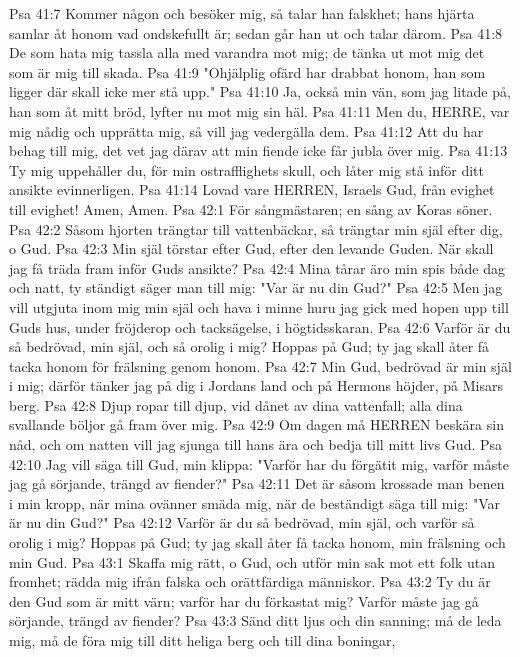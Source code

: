 Psa 41:7  Kommer någon och besöker mig, så talar han falskhet; hans hjärta samlar åt honom vad ondskefullt är; sedan går han ut och talar därom.
Psa 41:8  De som hata mig tassla alla med varandra mot mig; de tänka ut mot mig det som är mig till skada.
Psa 41:9  "Ohjälplig ofärd har drabbat honom, han som ligger där skall icke mer stå upp."
Psa 41:10  Ja, också min vän, som jag litade på, han som åt mitt bröd, lyfter nu mot mig sin häl.
Psa 41:11  Men du, HERRE, var mig nådig och upprätta mig, så vill jag vedergälla dem.
Psa 41:12  Att du har behag till mig, det vet jag därav att min fiende icke får jubla över mig.
Psa 41:13  Ty mig uppehåller du, för min ostrafflighets skull, och låter mig stå inför ditt ansikte evinnerligen.
Psa 41:14  Lovad vare HERREN, Israels Gud, från evighet till evighet! Amen, Amen.
Psa 42:1  För sångmästaren; en sång av Koras söner.
Psa 42:2  Såsom hjorten trängtar till vattenbäckar, så trängtar min själ efter dig, o Gud.
Psa 42:3  Min själ törstar efter Gud, efter den levande Guden. När skall jag få träda fram inför Guds ansikte?
Psa 42:4  Mina tårar äro min spis både dag och natt, ty ständigt säger man till mig: "Var är nu din Gud?"
Psa 42:5  Men jag vill utgjuta inom mig min själ och hava i minne huru jag gick med hopen upp till Guds hus, under fröjderop och tacksägelse, i högtidsskaran.
Psa 42:6  Varför är du så bedrövad, min själ, och så orolig i mig? Hoppas på Gud; ty jag skall åter få tacka honom för frälsning genom honom.
Psa 42:7  Min Gud, bedrövad är min själ i mig; därför tänker jag på dig i Jordans land och på Hermons höjder, på Misars berg.
Psa 42:8  Djup ropar till djup, vid dånet av dina vattenfall; alla dina svallande böljor gå fram över mig.
Psa 42:9  Om dagen må HERREN beskära sin nåd, och om natten vill jag sjunga till hans ära och bedja till mitt livs Gud.
Psa 42:10  Jag vill säga till Gud, min klippa: "Varför har du förgätit mig, varför måste jag gå sörjande, trängd av fiender?"
Psa 42:11  Det är såsom krossade man benen i min kropp, när mina ovänner smäda mig, när de beständigt säga till mig: "Var är nu din Gud?"
Psa 42:12  Varför är du så bedrövad, min själ, och varför så orolig i mig? Hoppas på Gud; ty jag skall åter få tacka honom, min frälsning och min Gud.
Psa 43:1  Skaffa mig rätt, o Gud, och utför min sak mot ett folk utan fromhet; rädda mig ifrån falska och orättfärdiga människor.
Psa 43:2  Ty du är den Gud som är mitt värn; varför har du förkastat mig? Varför måste jag gå sörjande, trängd av fiender?
Psa 43:3  Sänd ditt ljus och din sanning; må de leda mig, må de föra mig till ditt heliga berg och till dina boningar,
